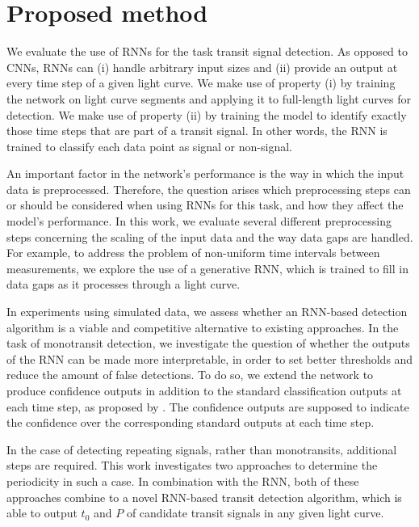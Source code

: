 
\section{Proposed method}
\label{sec:proposed}

We evaluate the use of RNNs for the task transit signal detection. As opposed to CNNs, RNNs can (i) handle arbitrary input sizes and (ii) provide an output at every time step of a given light curve. We make use of property (i) by training the network on light curve segments and applying it to full-length light curves for detection. We make use of property (ii) by training the model to identify exactly those time steps that are part of a transit signal. In other words, the RNN is trained to classify each data point as signal or non-signal.

An important factor in the network's performance is the way in which the input data is preprocessed. Therefore, the question arises which preprocessing steps can or should be considered when using RNNs for this task, and how they affect the model’s performance. In this work, we evaluate several different preprocessing steps concerning the scaling of the input data and the way data gaps are handled. For example, to address the problem of non-uniform time intervals between measurements, we explore the use of a generative RNN, which is trained to fill in data gaps as it processes through a light curve. 

In experiments using simulated data, we assess whether an RNN-based detection algorithm is a viable and competitive alternative to existing approaches. In the task of monotransit detection, we investigate the question of whether the outputs of the RNN can be made more interpretable, in order to set better thresholds and reduce the amount of false detections. 
To do so, we extend the network to produce confidence outputs in addition to the standard classification outputs at each time step, as proposed by \cite{devries2018learning}. 
The confidence outputs are supposed to indicate the confidence over the corresponding standard outputs at each time step.

In the case of detecting repeating signals, rather than monotransits, additional steps are required. This work investigates two approaches to determine the periodicity in such a case. In combination with the RNN, both of these approaches combine to a novel RNN-based transit detection algorithm, which is able to output $t_0$ and $P$ of candidate transit signals in any given light curve.

